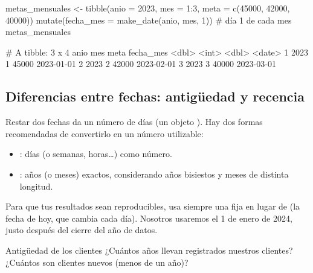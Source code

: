 \begin{rcode}
metas_mensuales <- tibble(anio = 2023, mes = 1:3,
                          meta = c(45000, 42000, 40000)) %
  mutate(fecha_mes = make_date(anio, mes, 1))    # día 1 de cada mes
metas_mensuales
\end{rcode}
\begin{rsalida}
# A tibble: 3 x 4
   anio   mes  meta fecha_mes 
  <dbl> <int> <dbl> <date>    
1  2023     1 45000 2023-01-01
2  2023     2 42000 2023-02-01
3  2023     3 40000 2023-03-01
\end{rsalida}

\subsection{Diferencias entre fechas: antigüedad y recencia}

Restar dos fechas da un número de días (un objeto ). Hay
dos formas recomendadas de convertirlo en un número utilizable:

\begin{itemize}
  \item {}: días
        (o semanas, horas\ldots) como número.
  \item {}: años (o
        meses) exactos, considerando años bisiestos y meses de distinta
        longitud.
\end{itemize}

Para que tus resultados sean reproducibles, usa siempre una  fija en lugar de  (la fecha de hoy, que cambia
cada día). Nosotros usaremos el 1 de enero de 2024, justo después del cierre
del año de datos.

\begin{ejemplo}{Antigüedad de los clientes}
¿Cuántos años llevan registrados nuestros clientes? ¿Cuántos son clientes
nuevos (menos de un año)?
\end{ejemplo}

